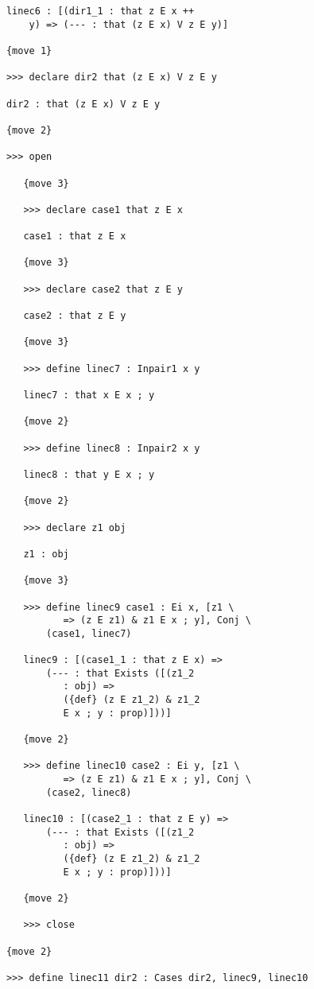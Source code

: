 \documentclass[12pt]{article}
\begin{document}
\begin{verbatim}
      linec6 : [(dir1_1 : that z E x ++ 
          y) => (--- : that (z E x) V z E y)]

      {move 1}

      >>> declare dir2 that (z E x) V z E y

      dir2 : that (z E x) V z E y

      {move 2}

      >>> open

         {move 3}

         >>> declare case1 that z E x

         case1 : that z E x

         {move 3}

         >>> declare case2 that z E y

         case2 : that z E y

         {move 3}

         >>> define linec7 : Inpair1 x y

         linec7 : that x E x ; y

         {move 2}

         >>> define linec8 : Inpair2 x y

         linec8 : that y E x ; y

         {move 2}

         >>> declare z1 obj

         z1 : obj

         {move 3}

         >>> define linec9 case1 : Ei x, [z1 \
                => (z E z1) & z1 E x ; y], Conj \
             (case1, linec7)

         linec9 : [(case1_1 : that z E x) => 
             (--- : that Exists ([(z1_2 
                : obj) => 
                ({def} (z E z1_2) & z1_2 
                E x ; y : prop)]))]

         {move 2}

         >>> define linec10 case2 : Ei y, [z1 \
                => (z E z1) & z1 E x ; y], Conj \
             (case2, linec8)

         linec10 : [(case2_1 : that z E y) => 
             (--- : that Exists ([(z1_2 
                : obj) => 
                ({def} (z E z1_2) & z1_2 
                E x ; y : prop)]))]

         {move 2}

         >>> close

      {move 2}

      >>> define linec11 dir2 : Cases dir2, linec9, linec10


\end{verbatim}
\end{document}

